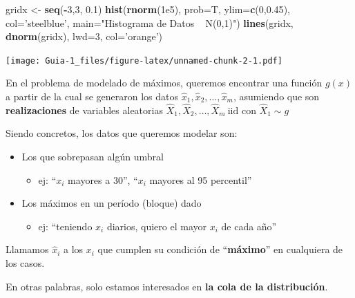 \documentclass[
]{article}
\newenvironment{Shaded}{\begin{snugshade}}{\end{snugshade}}
\newcommand{\DataTypeTok}[1]{\textcolor[rgb]{0.13,0.29,0.53}{#1}}
\newcommand{\DecValTok}[1]{\textcolor[rgb]{0.00,0.00,0.81}{#1}}
\newcommand{\FloatTok}[1]{\textcolor[rgb]{0.00,0.00,0.81}{#1}}
\newcommand{\KeywordTok}[1]{\textcolor[rgb]{0.13,0.29,0.53}{\textbf{#1}}}
\newcommand{\NormalTok}[1]{#1}
\newcommand{\OperatorTok}[1]{\textcolor[rgb]{0.81,0.36,0.00}{\textbf{#1}}}
\newcommand{\StringTok}[1]{\textcolor[rgb]{0.31,0.60,0.02}{#1}}
\providecommand{\tightlist}{%
  \setlength{\itemsep}{0pt}\setlength{\parskip}{0pt}}
\begin{document}
\begin{Shaded}
\begin{Highlighting}[]
\NormalTok{gridx <-}\StringTok{ }\KeywordTok{seq}\NormalTok{(}\OperatorTok{-}\DecValTok{3}\NormalTok{,}\DecValTok{3}\NormalTok{, }\FloatTok{0.1}\NormalTok{)}
\KeywordTok{hist}\NormalTok{(}\KeywordTok{rnorm}\NormalTok{(}\FloatTok{1e5}\NormalTok{), }\DataTypeTok{prob=}\NormalTok{T, }\DataTypeTok{ylim=}\KeywordTok{c}\NormalTok{(}\DecValTok{0}\NormalTok{,}\FloatTok{0.45}\NormalTok{), }\DataTypeTok{col=}\StringTok{'steelblue'}\NormalTok{, }\DataTypeTok{main=}\StringTok{"Histograma de Datos ~ N(0,1)"}\NormalTok{)}
\KeywordTok{lines}\NormalTok{(gridx, }\KeywordTok{dnorm}\NormalTok{(gridx), }\DataTypeTok{lwd=}\DecValTok{3}\NormalTok{, }\DataTypeTok{col=}\StringTok{'orange'}\NormalTok{)}
\end{Highlighting}
\end{Shaded}

\texttt{[image: Guia-1\_files/figure-latex/unnamed-chunk-2-1.pdf]}

En el problema de modelado de máximos, queremos encontrar una función
\(g(x)\) a partir de la cual se generaron los datos
\(\hat x_1, \hat x_2, \dots ,\hat x_m\), asumiendo que son
\textbf{realizaciones} de variables aleatorias
\(\hat X_1, \hat X_2, \dots, \hat X_m \ \text{iid}\) con
\(\hat X_1 \sim g\)

Siendo concretos, los datos que queremos modelar son:

\begin{itemize}
\item
  Los que sobrepasan algún umbral

  \begin{itemize}
  \tightlist
  \item
    ej: ``\(x_i\) mayores a 30'', ``\(x_i\) mayores al 95 percentil''
  \end{itemize}
\item
  Los máximos en un período (bloque) dado

  \begin{itemize}
  \tightlist
  \item
    ej: ``teniendo \(x_i\) diarios, quiero el mayor \(x_i\) de cada
    año''
  \end{itemize}
\end{itemize}

Llamamos \(\hat x_i\) a los \(x_i\) que cumplen su condición de
``\textbf{máximo}'' en cualquiera de los casos.

En otras palabras, solo estamos interesados en \textbf{la cola de la
distribución}.
\end{document}
